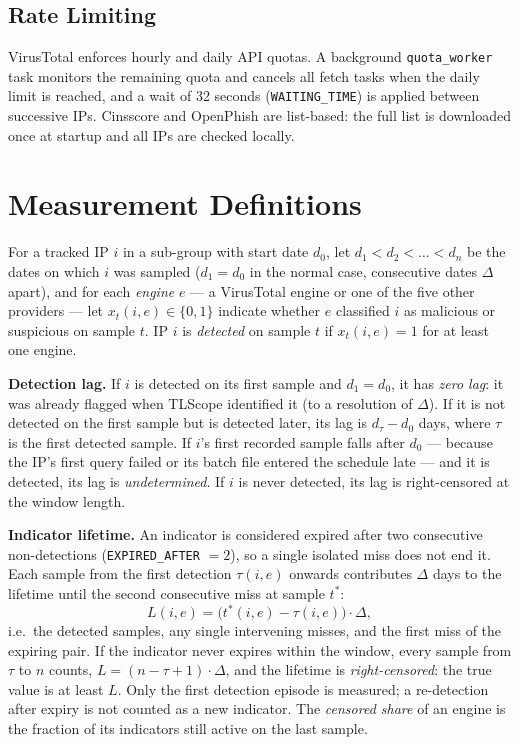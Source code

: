 \subsection{Rate Limiting}
\label{sec:rate_limiting}

VirusTotal enforces hourly and daily API quotas. A background \texttt{quota\_worker} task monitors the
remaining quota and cancels all fetch tasks when the daily limit is reached, and a wait of 32 seconds
(\texttt{WAITING\_TIME}) is applied between successive IPs. Cinsscore and OpenPhish are list-based:
the full list is downloaded once at startup and all IPs are checked locally.

\section{Measurement Definitions}
\label{sec:notation}

For a tracked IP $i$ in a sub-group with start date $d_0$, let $d_1 < d_2 < \dots < d_n$ be the
dates on which $i$ was sampled ($d_1 = d_0$ in the normal case, consecutive dates $\Delta$ apart),
and for each \emph{engine} $e$ --- a VirusTotal engine or one of the five other providers --- let
$x_t(i,e) \in \{0,1\}$ indicate whether $e$ classified $i$ as malicious or suspicious on sample $t$.
IP $i$ is \emph{detected} on sample $t$ if $x_t(i,e) = 1$ for at least one engine.

\textbf{Detection lag.} If $i$ is detected on its first sample and $d_1 = d_0$, it has \emph{zero
lag}: it was already flagged when TLScope identified it (to a resolution of $\Delta$). If it is
not detected on the first sample but is detected later, its lag is $d_\tau - d_0$ days, where
$\tau$ is the first detected sample. If $i$'s first recorded sample falls after $d_0$ --- because the
IP's first query failed or its batch file entered the schedule late --- and it is detected, its lag
is \emph{undetermined}. If $i$ is never detected, its lag is right-censored at the window length.

\textbf{Indicator lifetime.} An indicator is considered expired after two consecutive non-detections
(\texttt{EXPIRED\_AFTER} $= 2$), so a single isolated miss does not end it. Each sample from the
first detection $\tau(i,e)$ onwards contributes $\Delta$ days to the lifetime until the second
consecutive miss at sample $t^*$:
\[
  L(i,e) = \bigl(t^*(i,e) - \tau(i,e)\bigr)\cdot\Delta ,
\]
i.e.\ the detected samples, any single intervening misses, and the first miss of the expiring pair.
If the indicator never expires within the window, every sample from $\tau$ to $n$ counts,
$L = (n - \tau + 1)\cdot\Delta$, and the lifetime is \emph{right-censored}: the true value is at
least $L$. Only the first detection episode is measured; a re-detection after expiry is not counted
as a new indicator. The \emph{censored share} of an engine is the fraction of its indicators still
active on the last sample.

